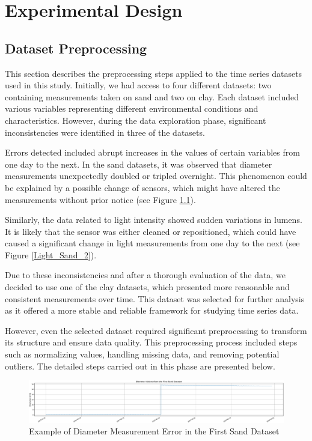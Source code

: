 \chapter{Experimental Design}

\section{Dataset Preprocessing}

This section describes the preprocessing steps applied to the time series datasets used in this study. Initially, we had access to four different datasets: two containing measurements taken on sand and two on clay. Each dataset included various variables representing different environmental conditions and characteristics. However, during the data exploration phase, significant inconsistencies were identified in three of the datasets.

Errors detected included abrupt increases in the values of certain variables from one day to the next. In the sand datasets, it was observed that diameter measurements unexpectedly doubled or tripled overnight. This phenomenon could be explained by a possible change of sensors, which might have altered the measurements without prior notice (see Figure \ref{Diameter_Sand_1}).

Similarly, the data related to light intensity showed sudden variations in lumens. It is likely that the sensor was either cleaned or repositioned, which could have caused a significant change in light measurements from one day to the next (see Figure \ref{Light_Sand_2}).

Due to these inconsistencies and after a thorough evaluation of the data, we decided to use one of the clay datasets, which presented more reasonable and consistent measurements over time. This dataset was selected for further analysis as it offered a more stable and reliable framework for studying time series data.

However, even the selected dataset required significant preprocessing to transform its structure and ensure data quality. This preprocessing process included steps such as normalizing values, handling missing data, and removing potential outliers. The detailed steps carried out in this phase are presented below.

\begin{figure}[htbp]
    \centering
    \includegraphics[width=15 cm]{5_ChapterDesign/figuras/1_DatasetIssues/Diameter_Sand_1}
    \caption{Example of Diameter Measurement Error in the First Sand Dataset}
    \label{Diameter_Sand_1}
\end{figure}

